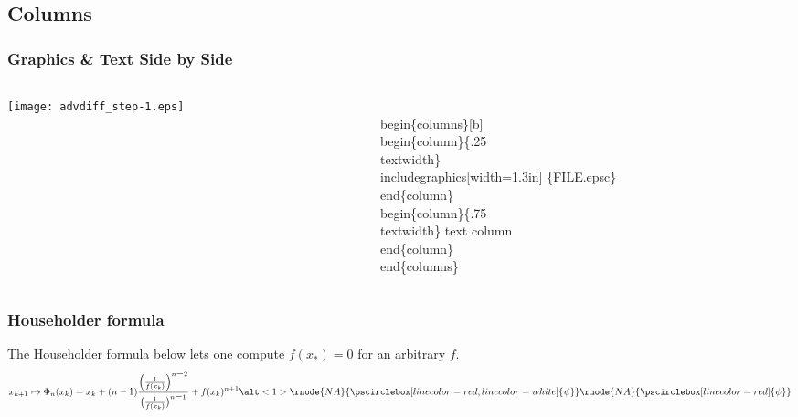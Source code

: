 \documentclass{beamer}
\begin{document}
\subsection{Columns}
\begin{frame}[fragile]
\frametitle{Graphics \& Text  Side by Side}
\begin{columns}[b]
  \begin{column}{.25\textwidth}
       \texttt{[image: advdiff\_step-1.eps]}
  \end{column}
    \begin{column}{.75\textwidth}
    \begin{semiverbatim}
 \alert<1>{\\begin\{columns\}[b]}
  \alert<2>{\\begin\{column\}\{.25\\textwidth\}}
        \alert<3>{\\includegraphics[width=1.3in]%
             \{FILE.epsc\}}
  \alert<2>{\\end\{column\}}
   \alert<4>{\\begin\{column\}\{.75\\textwidth\}}
        \alert<5>{text column}
   \alert<4>{\\end\{column\}}
 \alert<1>{\\end\{columns\}}
    \end{semiverbatim}
      \end{column}
\end{columns}
\end{frame}



\begin{frame}
\frametitle{Householder formula}

The Householder formula below lets one compute $f(x_\ast)=0$ for an arbitrary $f$.
{%
\begin{equation}\label{Householder}
x_{k+1}\mapsto \Phi_n(x_k)=x_k+(n-1)
\frac{\left( \frac{1}{f(x_k)}\right)^{n{\displaystyle-}2}}
{\bigl(\frac{1}{f(x_k)}\bigr)^{n{\displaystyle-}1}}+
f(x_k)^{n+1}%
\alt<1>{\rnode{NA}{\pscirclebox[linecolor=red,linecolor=white]{\psi}}}
{\rnode{NA}{\pscirclebox[linecolor=red]{\psi}}}
\end{equation}}


\end{frame}
\end{document}
